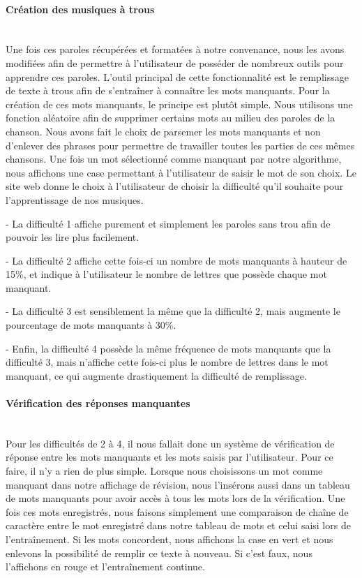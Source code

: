 \documentclass[12pt,french]{article}
\begin{document}
\paragraph{Création des musiques à trous \\\\}

Une fois ces paroles récupérées et formatées à notre convenance, nous les avons modifiées afin de permettre à l'utilisateur de posséder de nombreux outils pour apprendre ces paroles. L'outil principal de cette fonctionnalité est le remplissage de texte à trous afin de s'entraîner à connaître les mots manquants. Pour la création de ces mots manquants, le principe est plutôt simple. Nous utilisons une fonction aléatoire afin de supprimer certains mots au milieu des paroles de la chanson. Nous avons fait le choix de parsemer les mots manquants et non d'enlever des phrases pour permettre de travailler toutes les parties de ces mêmes chansons. Une fois un mot sélectionné comme manquant par notre algorithme, nous affichons une case permettant à l'utilisateur de saisir le mot de son choix. Le site web donne le choix à l'utilisateur de choisir la difficulté qu'il souhaite pour l'apprentissage de nos musiques.
\newline

- La difficulté 1 affiche purement et simplement les paroles sans trou afin de pouvoir les lire plus facilement. 

- La difficulté 2 affiche cette fois-ci un nombre de mots manquants à hauteur de 15\%, et indique à l'utilisateur le nombre de lettres que possède chaque mot manquant.

- La difficulté 3 est sensiblement la même que la difficulté 2, mais augmente le pourcentage de mots manquants à 30\%.

- Enfin, la difficulté 4 possède la même fréquence de mots manquants que la difficulté 3, mais n'affiche cette fois-ci plus le nombre de lettres dans le mot manquant, ce qui augmente drastiquement la difficulté de remplissage.  
     
\paragraph{Vérification des réponses manquantes \\\\}

Pour les difficultés de 2 à 4, il nous fallait donc un système de vérification de réponse entre les mots manquants et les mots saisis par l'utilisateur. Pour ce faire, il n'y a rien de plus simple. Lorsque nous choisissons un mot comme manquant dans notre affichage de révision, nous l'insérons aussi dans un tableau de mots manquants pour avoir accès à tous les mots lors de la vérification. Une fois ces mots enregistrés, nous faisons simplement une comparaison de chaîne de caractère entre le mot enregistré dans notre tableau de mots et celui saisi lors de l'entraînement. Si les mots concordent, nous affichons la case en vert et nous enlevons la possibilité de remplir ce texte à nouveau. Si c'est faux, nous l'affichons en rouge et l'entraînement continue.
\end{document}

